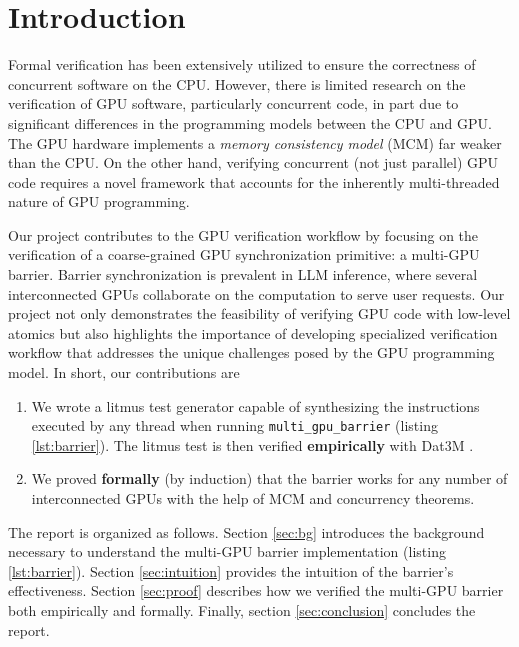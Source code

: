 \documentclass[acmsmall]{acmart}
\begin{document}
\maketitle

\section{Introduction}

Formal verification has been extensively utilized to ensure the correctness of concurrent software on the CPU. However, there is limited research on the verification of GPU software, particularly concurrent code, in part due to significant differences in the programming models between the CPU and GPU. The GPU hardware implements a \textit{memory consistency model} (MCM) far weaker than the CPU. On the other hand, verifying concurrent (not just parallel) GPU code requires a novel framework that accounts for the inherently multi-threaded nature of GPU programming.

Our project contributes to the GPU verification workflow by focusing on the verification of a coarse-grained GPU synchronization primitive: a multi-GPU barrier. Barrier synchronization is prevalent in LLM inference, where several interconnected GPUs collaborate on the computation to serve user requests. Our project not only demonstrates the feasibility of verifying GPU code with low-level atomics but also highlights the importance of developing specialized verification workflow that addresses the unique challenges posed by the GPU programming model. In short, our contributions are

\begin{enumerate}
    \item We wrote a litmus test generator capable of synthesizing the instructions executed by any thread when running \verb|multi_gpu_barrier| (listing \ref{lst:barrier}). The litmus test is then verified \textbf{empirically} with Dat3M \cite{unified-analysis}.
    \item We proved \textbf{formally} (by induction) that the barrier works for any number of interconnected GPUs with the help of MCM and concurrency theorems.
\end{enumerate}

The report is organized as follows. Section \ref{sec:bg} introduces the background necessary to understand the multi-GPU barrier implementation (listing \ref{lst:barrier}). Section \ref{sec:intuition} provides the intuition of the barrier's effectiveness. Section \ref{sec:proof} describes how we verified the multi-GPU barrier both empirically and formally. Finally, section \ref{sec:conclusion} concludes the report.
\end{document}
